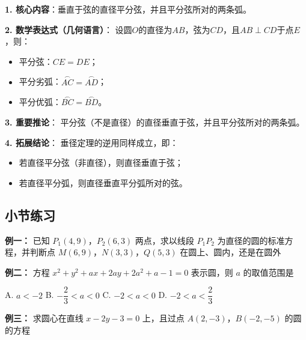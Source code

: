 \documentclass{article}
\begin{document}
\begin{tcolorbox}[colback=blue!10,colframe=blue!70!black,title=复习：垂径定理]
\textbf{1. 核心内容}：垂直于弦的直径平分弦，并且平分弦所对的两条弧。

\medskip
\textbf{2. 数学表达式（几何语言）}：
设圆$O$的直径为$AB$，弦为$CD$，且$AB \perp CD$于点$E$，则：
\begin{itemize}
    \item 平分弦：$CE = DE$；
    \item 平分劣弧：$\overset{\frown}{AC} = \overset{\frown}{AD}$；
    \item 平分优弧：$\overset{\frown}{BC} = \overset{\frown}{BD}$。
\end{itemize}

\medskip
\textbf{3. 重要推论}：
平分弦（不是直径）的直径垂直于弦，并且平分弦所对的两条弧。

\medskip
\textbf{4. 拓展结论}：
垂径定理的逆用同样成立，即：
\begin{itemize}
    \item 若直径平分弦（非直径），则直径垂直于弦；
    \item 若直径平分弧，则直径垂直平分弧所对的弦。
\end{itemize}
\end{tcolorbox}
\vspace{1\baselineskip}


\begin{center}
    \subsection*{小节练习}
\end{center}

\noindent\textbf{例一： }已知 \(P_1(4,9)\)，\(P_2(6,3)\) 两点，求以线段 \(P_1P_2\) 为直径的圆的标准方程，并判断点 \(M(6,9)\)，\(N(3,3)\)，\(Q(5,3)\) 在圆上、圆内，还是在圆外
\vspace{3\baselineskip}

\noindent\textbf{例二： }方程 \(x^2 + y^2 + ax + 2ay + 2a^2 + a - 1 = 0\) 表示圆，则 \(a\) 的取值范围是 

\vspace{0.5em}
\noindent
A. \(a < -2\) \quad
B. \(-\dfrac{2}{3} < a < 0\) \quad
C. \(-2 < a < 0\) \quad
D. \(-2 < a < \dfrac{2}{3}\)
\vspace{2\baselineskip}

\noindent\textbf{例三： } 求圆心在直线 \(x - 2y - 3 = 0\) 上，且过点 \(A(2,-3)\)，\(B(-2,-5)\) 的圆的方程
\vspace{3\baselineskip}
\end{document}
